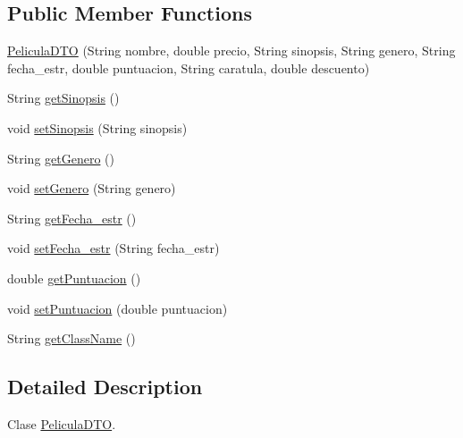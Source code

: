 \subsection*{Public Member Functions}
\begin{DoxyCompactItemize}
\item 
\mbox{\hyperlink{classes_1_1deusto_1_1server_1_1dto_1_1_pelicula_d_t_o_a17befc89b5876632d67c2ded3c40ae4c}{Pelicula\+D\+TO}} (String nombre, double precio, String sinopsis, String genero, String fecha\+\_\+estr, double puntuacion, String caratula, double descuento)
\item 
String \mbox{\hyperlink{classes_1_1deusto_1_1server_1_1dto_1_1_pelicula_d_t_o_a7552e89e622dc5518868d38f1f45948b}{get\+Sinopsis}} ()
\item 
void \mbox{\hyperlink{classes_1_1deusto_1_1server_1_1dto_1_1_pelicula_d_t_o_a794472de752d1121df491d74305ebb78}{set\+Sinopsis}} (String sinopsis)
\item 
String \mbox{\hyperlink{classes_1_1deusto_1_1server_1_1dto_1_1_pelicula_d_t_o_afe9947c12142baa9bfa858e4a4b4c9e9}{get\+Genero}} ()
\item 
void \mbox{\hyperlink{classes_1_1deusto_1_1server_1_1dto_1_1_pelicula_d_t_o_a9e8ed8ffc80f591e333c9a8b1f14cc07}{set\+Genero}} (String genero)
\item 
String \mbox{\hyperlink{classes_1_1deusto_1_1server_1_1dto_1_1_pelicula_d_t_o_a5e325d8db65275004d55875de3dd49b0}{get\+Fecha\+\_\+estr}} ()
\item 
void \mbox{\hyperlink{classes_1_1deusto_1_1server_1_1dto_1_1_pelicula_d_t_o_a9def0f1adc3189268b5a36bd8d8fe667}{set\+Fecha\+\_\+estr}} (String fecha\+\_\+estr)
\item 
double \mbox{\hyperlink{classes_1_1deusto_1_1server_1_1dto_1_1_pelicula_d_t_o_a9c554f7b6d9891f4457b61a43abe7a38}{get\+Puntuacion}} ()
\item 
void \mbox{\hyperlink{classes_1_1deusto_1_1server_1_1dto_1_1_pelicula_d_t_o_a47f7353eee852105075ca6fb74d9482b}{set\+Puntuacion}} (double puntuacion)
\item 
String \mbox{\hyperlink{classes_1_1deusto_1_1server_1_1dto_1_1_pelicula_d_t_o_a35b279538dad8e659a21d98a0e0b4c30}{get\+Class\+Name}} ()
\end{DoxyCompactItemize}


\subsection{Detailed Description}
Clase \mbox{\hyperlink{classes_1_1deusto_1_1server_1_1dto_1_1_pelicula_d_t_o}{Pelicula\+D\+TO}}. 

